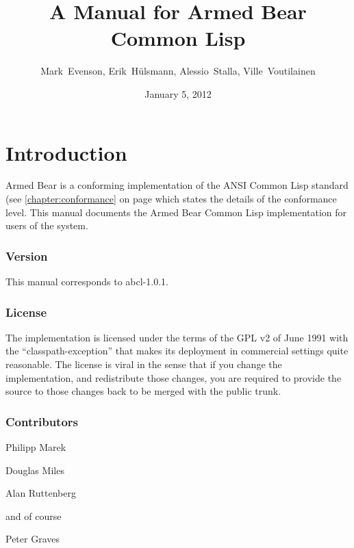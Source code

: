 \documentclass[10pt]{book}
\begin{document}
\title{A Manual for Armed Bear Common Lisp}
\date{January 5, 2012}
\author{Mark~Evenson, Erik~H\"{u}lsmann, Alessio~Stalla, Ville~Voutilainen}

\maketitle

\tableofcontents

\chapter{Introduction}

Armed Bear is a conforming implementation of the ANSI Common Lisp
standard (see \ref{chapter:conformance} on page
\pageref{chapter:conformance} which states the details of the
conformance level.  This manual documents the Armed Bear Common Lisp
implementation for users of the system.

\subsection{Version}
This manual corresponds to abcl-1.0.1.

\subsection{License}

The implementation is licensed under the terms of the GPL v2 of June
1991 with the ``classpath-exception'' that makes its deployment in
commercial settings quite reasonable.  The license is viral in the
sense that if you change the implementation, and redistribute those
changes, you are required to provide the source to those changes back
to be merged with the public trunk.

\subsection{Contributors}


Philipp Marek

Douglas Miles

Alan Ruttenberg

and of course

Peter Graves
\end{document}
